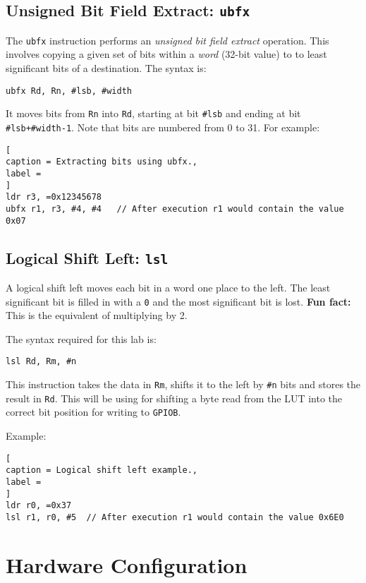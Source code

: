 \documentclass{UoNMCHA}
\numberwithin{equation}{section}
\begin{document}
\subsection{Unsigned Bit Field Extract: \texttt{ubfx}}

The \texttt{ubfx} instruction performs an \textit{unsigned bit field extract} operation. This involves copying a given set of bits within a \textit{word} (32-bit value) to to least significant bits of a destination. The syntax is:

\texttt{ubfx Rd, Rn, \#lsb, \#width}

It moves bits from \texttt{Rn} into \texttt{Rd}, starting at bit \texttt{\#lsb} and ending at bit \texttt{\#lsb+\#width-1}. Note that bits are numbered from 0 to 31. For example:

\begin{lstlisting}[
caption = Extracting bits using ubfx.,
label = 
]
ldr r3, =0x12345678
ubfx r1, r3, #4, #4   // After execution r1 would contain the value 0x07
\end{lstlisting}

\subsection{Logical Shift Left: \texttt{lsl}}

A logical shift left moves each bit in a word one place to the left. The least significant bit is filled in with a \texttt{0} and the most significant bit is lost. \textbf{Fun fact:} This is the equivalent of multiplying by 2.

The syntax required for this lab is:

\texttt{lsl Rd, Rm, \#n}

This instruction takes the data in \texttt{Rm}, shifts it to the left by \texttt{\#n} bits and stores the result in \texttt{Rd}. This will be using for shifting a byte read from the LUT into the correct bit position for writing to \texttt{GPIOB}.

Example:

\begin{lstlisting}[
caption = Logical shift left example.,
label = 
]
ldr r0, =0x37
lsl r1, r0, #5  // After execution r1 would contain the value 0x6E0

\end{lstlisting}


\section{Hardware Configuration}
\end{document}

